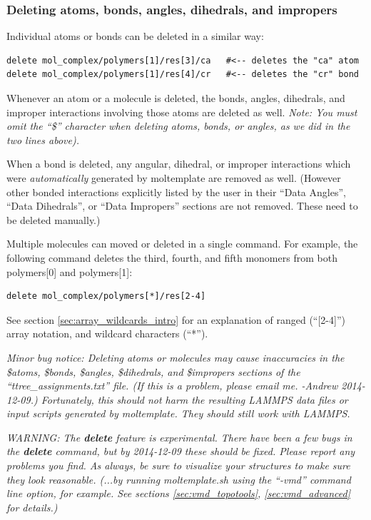 \documentclass[11pt]{article}
\begin{document}
\subsubsection{Deleting atoms, bonds, angles, dihedrals, and impropers}
\label{sec:delete_atoms_bonds}
Individual atoms or bonds can be deleted in a similar way:
\begin{verbatim}
delete mol_complex/polymers[1]/res[3]/ca   #<-- deletes the "ca" atom
delete mol_complex/polymers[1]/res[4]/cr   #<-- deletes the "cr" bond
\end{verbatim}
Whenever an atom or a molecule is deleted, the bonds, angles, dihedrals, 
and improper interactions involving those atoms are deleted as well.
\textit{Note: You must omit the ``\$'' character when deleting atoms,
bonds, or angles, as we did in the two lines above).}



When a bond is deleted, any angular, dihedral, or improper 
interactions which were \textit{automatically} 
generated by moltemplate are removed as well.
(However other bonded interactions explicitly listed by the user in their
``Data Angles'', ``Data Dihedrals'', or ``Data Impropers'' sections
are not removed.  These need to be deleted manually.)

Multiple molecules can moved or deleted in a single command.  For example,
the following command deletes the third, fourth, and fifth monomers from 
both polymers[0] and polymers[1]:
\begin{verbatim}
delete mol_complex/polymers[*]/res[2-4]
\end{verbatim}
See section \ref{sec:array_wildcards_intro} for an
explanation of ranged (``[2-4]'') array notation, 
and wildcard characters (``*'').

\textit{Minor bug notice: 
Deleting atoms or molecules may cause 
inaccuracies in the \$atoms, \$bonds, \$angles, \$dihedrals, and \$impropers
sections of the ``ttree\_assignments.txt'' file.
(If this is a problem, please email me. -Andrew 2014-12-09.)
Fortunately, this should not harm the resulting LAMMPS data files or input
scripts generated by moltemplate.  They should still work with LAMMPS.}

\textit{WARNING: The \textbf{delete} feature is experimental.
There have been a few bugs in the \textbf{delete} command, but by 2014-12-09
these should be fixed.  Please report any problems you find.
As always, be sure to visualize your structures 
to make sure they look reasonable.
(...by running moltemplate.sh using the 
 ``-vmd'' command line option, for example.
 See sections \ref{sec:vmd_topotools}, \ref{sec:vmd_advanced} for details.)}
\end{document}
